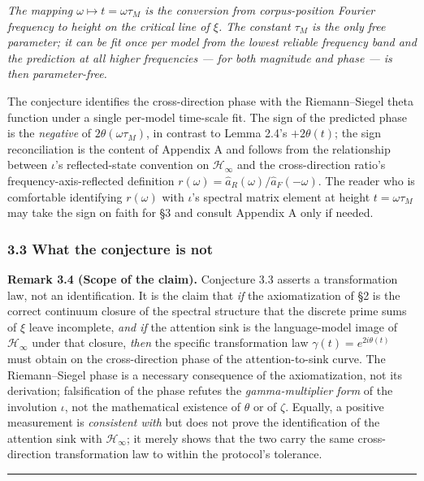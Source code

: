 \documentclass[
  letterpaper,
  11pt]{article}
\theoremstyle{plain}
\theoremstyle{definition}
\theoremstyle{remark}
\begin{document}
\emph{The mapping \(\omega \mapsto t = \omega \tau_M\) is the conversion from corpus-position Fourier frequency to height on the critical line of \(\xi\). The constant \(\tau_M\) is the only free parameter; it can be fit once per model from the lowest reliable frequency band and the prediction at all higher frequencies --- for both magnitude and phase --- is then parameter-free.}

The conjecture identifies the cross-direction phase with the Riemann--Siegel theta function under a single per-model time-scale fit. The sign of the predicted phase is the \emph{negative} of \(2\theta(\omega\tau_M)\), in contrast to Lemma 2.4's \(+2\theta(t)\); the sign reconciliation is the content of Appendix A and follows from the relationship between \(\iota\)'s reflected-state convention on \(\mathcal{H}_\infty\) and the cross-direction ratio's frequency-axis-reflected definition \(r(\omega) = \hat a_R(\omega)/\hat a_F(-\omega)\). The reader who is comfortable identifying \(r(\omega)\) with \(\iota\)'s spectral matrix element at height \(t = \omega\tau_M\) may take the sign on faith for §3 and consult Appendix A only if needed.

\subsubsection{3.3 What the conjecture is not}\label{what-the-conjecture-is-not}

\textbf{Remark 3.4 (Scope of the claim).} Conjecture 3.3 asserts a transformation law, not an identification. It is the claim that \emph{if} the axiomatization of §2 is the correct continuum closure of the spectral structure that the discrete prime sums of \(\xi\) leave incomplete, \emph{and if} the attention sink is the language-model image of \(\mathcal{H}_\infty\) under that closure, \emph{then} the specific transformation law \(\gamma(t) = e^{2i\theta(t)}\) must obtain on the cross-direction phase of the attention-to-sink curve. The Riemann--Siegel phase is a necessary consequence of the axiomatization, not its derivation; falsification of the phase refutes the \emph{gamma-multiplier form} of the involution \(\iota\), not the mathematical existence of \(\theta\) or of \(\zeta\). Equally, a positive measurement is \emph{consistent with} but does not prove the identification of the attention sink with \(\mathcal{H}_\infty\); it merely shows that the two carry the same cross-direction transformation law to within the protocol's tolerance.

\begin{center}\rule{0.5\linewidth}{0.5pt}\end{center}
\end{document}
